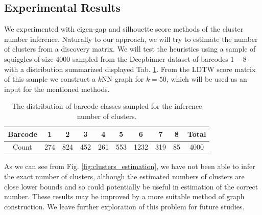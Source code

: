 \subsection{Experimental Results}
We experimented with eigen-gap and silhouette score methods of the cluster number inference. 
Naturally to our approach, we will try to estimate the number of clusters from a discovery matrix. We will test the heuristics using a sample of squiggles of size $4000$ sampled from the Deepbinner dataset of barcodes $1-8$ with a distribution summarized displayed Tab. \ref{tab:8bc_distribution}. From the LDTW score matrix of this sample we construct a $k$NN graph for $k=50$, which will be used as an input for the mentioned methods.

\begin{table}[!ht]
\centering
\begin{tabular}{|c|cccccccc|c|}
\hline
Barcode & 1   & 2   & 3   & 4   & 5   & 6    & 7   & 8 & Total \\
\hline
Count   & 274 & 824 & 452 & 261 & 553 & 1232 & 319 & 85 & 4000\\
\hline
\end{tabular}
\caption{The distribution of barcode classes sampled for the inference number of clusters.}
\label{tab:8bc_distribution}
\end{table}

As we can see from Fig. \ref{fig:clusters_estimation}, we have not been able to infer the exact number of clusters, although the estimated numbers of clusters are close lower bounds and so could potentially be useful in estimation of the correct number. These results may be improved by a more suitable method of graph construction. We leave further exploration of this problem for future studies.

